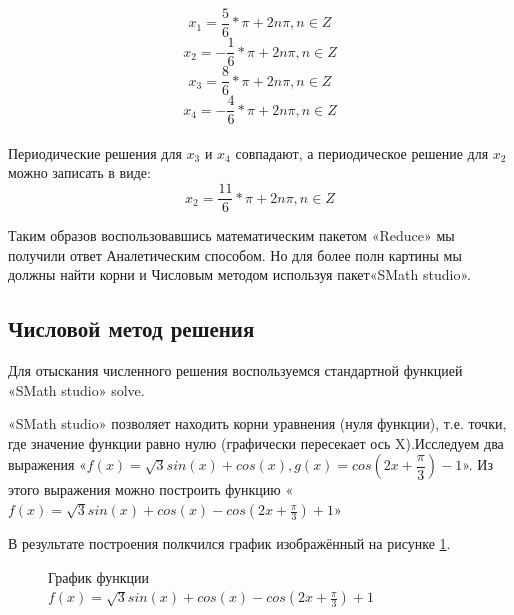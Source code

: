 \documentclass[russian,utf8,nocolumnxxxi,nocolumnxxxii]{eskdtext}
\begin{document}
$$x_1=\frac{5}{6}*\pi+2n\pi,n\in Z$$
$$x_2=-\frac{1}{6}*\pi+2n\pi,n\in Z$$
$$x_3=\frac{8}{6}*\pi+2n\pi,n\in Z$$
$$x_4=-\frac{4}{6}*\pi+2n\pi,n\in Z$$\\

Периодические решения для $x_3$ и $x_4$ совпадают, а периодическое решение для $x_2$ можно записать в виде:
$$x_2=\frac{11}{6}*\pi+2n\pi,n\in Z$$

Таким образов воспользовавшись математическим пакетом «Reduce» мы получили ответ Аналетическим способом. Но для более полн	 картины мы должны найти корни и Числовым методом используя пакет«SMath studio».

\subsection{Числовой метод решения} \label{resh}

Для отыскания численного решения воспользуемся стандартной функцией «SMath studio» solve.

«SMath studio» позволяет находить корни уравнения (нуля функции), т.е. точки, где значение функции равно нулю (графически пересекает ось X).Исследуем два выражения «$f(x)=\sqrt{3}sin(x)+cos(x),g(x)=cos(2x+\dfrac{\pi}{3})-1$». Из этого выражения можно построить функцию «$f(x)=\sqrt3 sin(x)+cos(x)-cos(2x+\frac{\pi}{3})+1$» 


В результате построения полкчился график изображённый на рисунке \ref{graf1}.
\begin{figure}[h]
\begin{center}
\caption{График функции $f(x)=\sqrt3 sin(x)+cos(x)-cos(2x+\frac{\pi}{3})+1$}
\label{graf1}
\end{center}
\end{figure}
\end{document}
